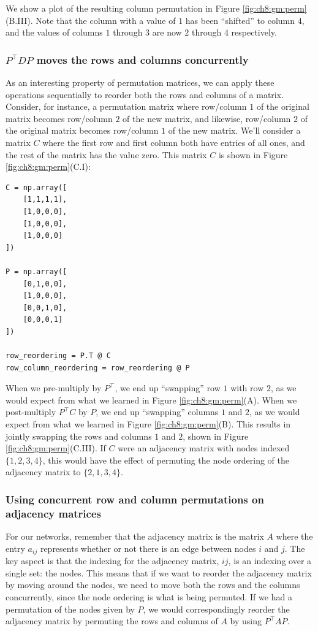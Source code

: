 We show a plot of the resulting column permutation in Figure \ref{fig:ch8:gm:perm}(B.III). Note that the column with a value of $1$ has been ``shifted'' to column $4$, and the values of columns $1$ through $3$ are now $2$ through $4$ respectively. 

\subsubsection*{$P^\top DP$ moves the rows and columns concurrently}

As an interesting property of permutation matrices, we can apply these operations sequentially to reorder both the rows and columns of a matrix. Consider, for instance, a permutation matrix where row/column $1$ of the original matrix becomes row/column $2$ of the new matrix, and likewise, row/column $2$ of the original matrix becomes row/column $1$ of the new matrix. We'll consider a matrix $C$ where the first row and first column both have entries of all ones, and the rest of the matrix has the value zero. This matrix $C$ is shown in Figure \ref{fig:ch8:gm:perm}(C.I):

\begin{lstlisting}[style=python]
C = np.array([
    [1,1,1,1],
    [1,0,0,0],
    [1,0,0,0],
    [1,0,0,0]
])

P = np.array([
    [0,1,0,0],
    [1,0,0,0],
    [0,0,1,0],
    [0,0,0,1]
])

row_reordering = P.T @ C
row_column_reordering = row_reordering @ P
\end{lstlisting}

When we pre-multiply by $P^\top$, we end up ``swapping'' row $1$ with row $2$, as we would expect from what we learned in Figure \ref{fig:ch8:gm:perm}(A). When we post-multiply $P^\top C$ by $P$, we end up ``swapping'' columns $1$ and $2$, as we would expect from what we learned in Figure \ref{fig:ch8:gm:perm}(B). This results in jointly swapping the rows and columns $1$ and $2$, shown in Figure \ref{fig:ch8:gm:perm}(C.III). If $C$ were an adjacency matrix with nodes indexed $\{1, 2, 3, 4\}$, this would have the effect of permuting the node ordering of the adjacency matrix to $\{2, 1, 3, 4\}$.

\subsubsection*{Using concurrent row and column permutations on adjacency matrices}

For our networks, remember that the adjacency matrix is the matrix $A$ where the entry $a_{ij}$ represents whether or not there is an edge between nodes $i$ and $j$. The key aspect is that the indexing for the adjacency matrix, $ij$, is an indexing over a single set: the nodes. This means that if we want to reorder the adjacency matrix by moving around the nodes, we need to move both the rows and the columns concurrently, since the node ordering is what is being permuted. If we had a permutation of the nodes given by $P$, we would correspondingly reorder the adjacency matrix by permuting the rows and columns of $A$ by using $P^\top AP$.



